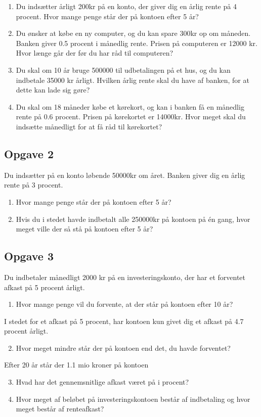 \begin{enumerate}[label = \roman*)]
	\item Du indsætter årligt 200kr på en konto, der giver dig en årlig rente på 4 procent. Hvor mange penge står der på kontoen efter 5 år?
	\item Du ønsker at købe en ny computer, og du kan spare 300kr op om måneden. Banken giver 0.5 procent i månedlig rente. Prisen på computeren er 12000 kr. Hvor længe går
	der før du har råd til computeren?
	\item Du skal om 10 år bruge 500000 til udbetalingen på et hus, og du kan indbetale 35000 kr årligt. Hvilken årlig rente skal du have af banken, for at dette kan lade sig gøre?
	\item Du skal om 18 måneder købe et kørekort, og kan i banken få en månedlig rente på 0.6 procent. Prisen på kørekortet er 14000kr. Hvor meget skal du indsætte månedligt
	for at få råd til kørekortet?
\end{enumerate}

\subsection*{Opgave 2}
Du indsætter på en konto løbende 50000kr om året. Banken giver dig en årlig rente på 3 procent. 
\begin{enumerate}[label=\roman*)]
	\item Hvor mange penge står der på kontoen efter 5 år?
	\item Hvis du i stedet havde indbetalt alle 250000kr på kontoen på én gang, hvor meget ville der så stå på kontoen efter 5 år?
\end{enumerate}

\subsection*{Opgave 3}
Du indbetaler månedligt 2000 kr på en investeringskonto, der har et forventet afkast på 5 procent årligt. 
\begin{enumerate}[label = \roman*)]
	\item Hvor mange penge vil du forvente, at der står på kontoen efter 10 år?
\end{enumerate}
I stedet for et afkast på 5 procent, har kontoen kun givet dig et afkast på 4.7 procent årligt.
\begin{enumerate}[label = \roman*)]
	\setcounter{enumi}{1}	
	\item Hvor meget mindre står der på kontoen end det, du havde forventet?
\end{enumerate}
Efter 20 år står der 1.1 mio kroner på kontoen
\begin{enumerate}[label = \roman*)]
	\setcounter{enumi}{2}	
	\item Hvad har det gennemsnitlige afkast været på i procent?
	\item Hvor meget af beløbet på investeringskontoen består af indbetaling og hvor meget består af renteafkast?
\end{enumerate}

